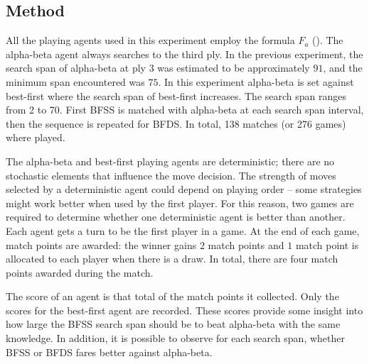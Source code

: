 \subsection*{Method}

All the playing agents used in this experiment employ the formula $F_a$ ().  The alpha-beta agent always searches to the third ply.  In the previous experiment, the search span of alpha-beta at ply 3 was estimated to be approximately $91$, and the minimum span encountered was $75$.  In this experiment alpha-beta is set against best-first where the search span of best-first increases.  The search span ranges from 2 to 70. First BFSS is matched with  alpha-beta at each search span interval, then the sequence is repeated for BFDS.  In total, 138 matches (or 276 games) where played.

The alpha-beta and best-first playing agents are deterministic; there are no stochastic elements that influence the move decision. The strength of moves selected by a deterministic agent could depend on playing order -- some strategies might work better when used by the first player.  For this reason, two games are required to determine whether one deterministic agent is better than another. Each agent gets a turn to be the first player in a  game. At the end of each game, match points are awarded: the winner gains $2$ match points and $1$ match point is allocated to each player when there is a draw. In total, there are four match points awarded during the match.  

The score of an agent is that total of the match points it collected.  Only the scores for the best-first agent are recorded.  These scores provide some insight into how large the BFSS search span should be to beat alpha-beta with the same knowledge. In addition, it is possible to observe for each search span, whether BFSS or BFDS fares better against alpha-beta.
  
